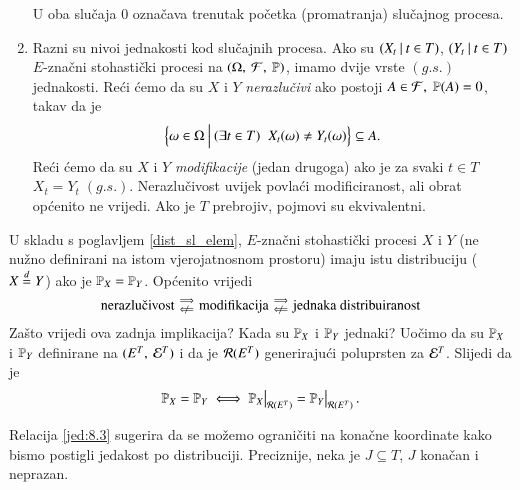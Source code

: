 \begin{nap}
\begin{enumerate}[label=(\alph*)]
\begin{itemize}
        \end{itemize}
        U oba slu\v caja $0$ ozna\v cava trenutak po\v cetka  (promatranja) slu\v cajnog procesa.
        \item Razni su nivoi jednakosti kod slu\v cajnih procesa.
        Ako su $({X_t} \: | \: {t \in T})$, $({Y_t} \: | \: {t \in T})$ $E$-zna\v cni stohasti\v cki procesi na $(\Omega, \: \mathcal{F}, \: \mathbb{P})$, imamo dvije vrste $(g.s.)$ jednakosti.
        Re\' ci \' cemo da su $X$ i $Y$ \emph{nerazlu\v civi} ako postoji $A \in \mathcal{F}, \; \mathbb{P}({A}) = 0$, takav da je
        \begin{equation*}
            \Big\{ {\omega \in \Omega} \: \Big| \: {(\exists t \in T) \; \; X_t (\omega) \neq Y_t (\omega)} \Big\} \subseteq A.
        \end{equation*}
        Re\' ci \' cemo da su $X$ i $Y$ \emph{modifikacije} (jedan drugoga) ako je za svaki $t \in T$ $X_t = Y_t \; (g.s.)$.
        Nerazlu\v civost uvijek povla\' ci modificiranost, ali obrat op\' cenito ne vrijedi.
        Ako je $T$ prebrojiv, pojmovi su ekvivalentni.
    \end{enumerate}
\end{nap}

U skladu s poglavljem \ref{dist_sl_elem}, $E$-zna\v cni stohasti\v cki procesi $X$ i $Y$ (ne nu\v zno definirani na istom vjerojatnosnom prostoru) imaju istu distribuciju ($X \overset{d}{=} Y$) ako je $\mathbb{P}_X = \mathbb{P}_Y$.
Op\' cenito vrijedi
\begin{equation*}
    \textnormal{nerazlu\v civost}
    \begin{smallmatrix}
        \implies\\
        \notimpliedby
    \end{smallmatrix}
    \textnormal{modifikacija}
    \begin{smallmatrix}
        \implies\\
        \notimpliedby
    \end{smallmatrix}
    \textnormal{jednaka distribuiranost}
\end{equation*}
Za\v sto vrijedi ova zadnja implikacija?
Kada su $\mathbb{P}_X$ i $\mathbb{P}_Y$ jednaki?
Uo\v cimo da su $\mathbb{P}_X$ i $\mathbb{P}_Y$ definirane na $({E^T}, \: {\mathcal{E}^T})$ i da je $\mathcal{R}({E^T})$ generiraju\' ci poluprsten za $\mathcal{E}^T$.
Slijedi da je
\begin{equation}    \label{jed:8.3}
    \masP_X = \masP_Y
    \iff
    \restr{\masP_X}{\prsten{E^T}} = \restr{\masP_Y}{\prsten{E^T}}.
\end{equation}

Relacija \eqref{jed:8.3} sugerira da se mo\v zemo ograni\v citi na kona\v cne koordinate kako bismo postigli jedakost po distribuciji.
Preciznije, neka je $J \subseteq T$, $J$ kona\v can i neprazan.


